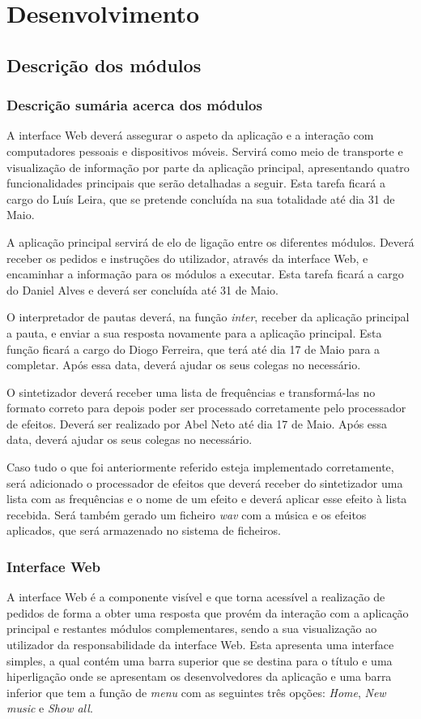 \documentclass[11pt,openany,twoside]{report}
\begin{document}
\part{Desenvolvimento}


\chapter{Descrição dos módulos}

\section{Descrição sumária acerca dos módulos}
A interface Web deverá assegurar o aspeto da aplicação e a interação com computadores pessoais e dispositivos móveis. Servirá como meio de transporte e visualização de informação por parte da aplicação principal, apresentando quatro funcionalidades principais que serão detalhadas a seguir. Esta tarefa ficará a cargo do Luís Leira, que se pretende concluída na sua totalidade até dia 31 de Maio.

A aplicação principal servirá de elo de ligação entre os diferentes módulos. Deverá receber os pedidos e instruções do utilizador, através da interface Web, e encaminhar a informação para os módulos a executar. Esta tarefa ficará a cargo do Daniel Alves e deverá ser concluída até 31 de Maio.

O interpretador de pautas deverá, na função \textit{inter}, receber da aplicação principal a pauta, e enviar a sua resposta novamente para a aplicação principal. Esta função ficará a cargo do Diogo Ferreira, que terá até dia 17 de Maio para a completar. Após essa data, deverá ajudar os seus colegas no necessário.

O sintetizador deverá receber uma lista de frequências e transformá-las no formato correto para depois poder ser processado corretamente pelo processador de efeitos. Deverá ser realizado por Abel Neto até dia 17 de Maio. Após essa data, deverá ajudar os seus colegas no necessário.

Caso tudo o que foi anteriormente referido esteja implementado corretamente, será adicionado o processador de efeitos que deverá receber do sintetizador uma lista com as frequências e o nome de um efeito e deverá aplicar esse efeito à lista recebida. Será também gerado um ficheiro \textit{wav} com a música e os efeitos aplicados, que será armazenado no sistema de ficheiros.

\section{Interface Web}
A interface Web é a componente visível e que torna acessível a realização de pedidos de forma a obter uma resposta que provém da interação com a aplicação principal e restantes módulos complementares, sendo a sua visualização ao utilizador da responsabilidade da interface Web. Esta apresenta uma interface simples, a qual contém uma barra superior que se destina para o título e uma hiperligação onde se apresentam os desenvolvedores da aplicação e uma barra inferior que tem a função de \textit{menu} com as seguintes três opções: \textit{Home}, \textit{New music} e \textit{Show all}.
\end{document}

